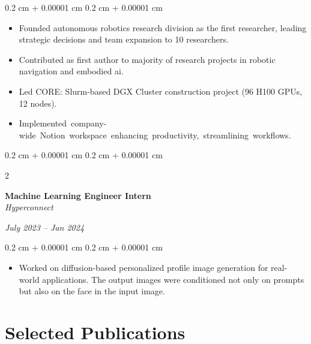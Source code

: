 \documentclass[10pt, letterpaper]{article}
\newenvironment{highlights}{
    \begin{itemize}[
        topsep=0.10 cm,
        parsep=0.10 cm,
        partopsep=0pt,
        itemsep=0pt,
        leftmargin=0.4 cm + 10pt
    ]
}{
    \end{itemize}
} %
\newenvironment{onecolentry}{
    \begin{adjustwidth}{
        0.2 cm + 0.00001 cm
    }{
        0.2 cm + 0.00001 cm
    }
}{
    \end{adjustwidth}
} %
\newenvironment{twocolentry}[2][]{
    \onecolentry
    \def\secondColumn{#2}
    \setcolumnwidth{\fill, 4.5 cm}
    \begin{paracol}{2}
}{
    \switchcolumn \raggedleft \secondColumn
    \end{paracol}
    \endonecolentry
} %
\newenvironment{pubentry}[2][]{
    \onecolentry
    \def\secondColumn{#2}
    \setcolumnwidth{\fill, 2 cm}
    \begin{paracol}{2}
}{
    \switchcolumn \raggedleft \secondColumn
    \end{paracol}
    \endonecolentry
} %
\let\hrefWithoutArrow\href
\renewcommand{\href}[2]{\hrefWithoutArrow{#1}{\ifthenelse{\equal{#2}{}}{ }{#2 }\raisebox{.15ex}{\footnotesize \faExternalLink*}}}
\begin{document}
\vspace{0.10 cm}
\begin{onecolentry}
    \begin{highlights}
        \item Founded autonomous robotics research division as the first researcher, leading strategic decisions and team expansion to 10 researchers.
        \item Contributed as first author to majority of research projects in robotic navigation and embodied ai.
        \item Led CORE: Slurm-based DGX Cluster construction project (96 H100 GPUs, 12 nodes). \href{https://worv.ghost.io/core-construction/}{[Blog]}
        \item \mbox{Implemented company-wide Notion workspace enhancing productivity, streamlining workflows.} \href{https://milkclouds.notion.site/DBs-template-1816b908318e809e9f93ecbfe7d4ca86}{[Template]}
    \end{highlights}
\end{onecolentry}

\vspace{0.2 cm}

\begin{twocolentry}{
        \textit{July 2023 – Jan 2024}
    }
    \textbf{Machine Learning Engineer Intern}
    \\
    \textit{Hyperconnect}
\end{twocolentry}

\vspace{0.10 cm}
\begin{onecolentry}
    \begin{highlights}
        \item Worked on diffusion-based personalized profile image generation for real-world applications. The output images were conditioned not only on prompts but also on the face in the input image.
    \end{highlights}
\end{onecolentry}

\section{Selected Publications}

%
%
%
%
\end{document}
